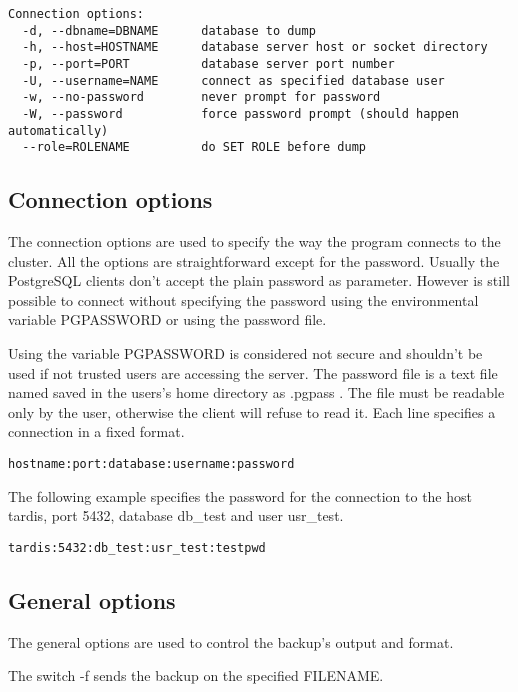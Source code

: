 \begin{verbatim}
Connection options:
  -d, --dbname=DBNAME      database to dump
  -h, --host=HOSTNAME      database server host or socket directory
  -p, --port=PORT          database server port number
  -U, --username=NAME      connect as specified database user
  -w, --no-password        never prompt for password
  -W, --password           force password prompt (should happen automatically)
  --role=ROLENAME          do SET ROLE before dump

\end{verbatim}

\subsection{Connection options}
The connection options are used to specify the way the program connects to the cluster. All the options are
straightforward except for the password. Usually the PostgreSQL clients don't accept the plain password as
parameter. However is still possible to connect without specifying the password using the
environmental variable PGPASSWORD or using the password file.\newline

Using the variable PGPASSWORD is considered not secure and shouldn't be used if  not trusted users are
accessing the server. The password file is a text file named saved in the users's home directory as
.pgpass . The file must be readable only by the user, otherwise the client will refuse to read it.\newline
Each line specifies a connection in a fixed format.
\begin{verbatim}
hostname:port:database:username:password
\end{verbatim}

The following example specifies the password for the connection to the host tardis, port 5432, database
db\_test and user usr\_test.

\begin{verbatim}
tardis:5432:db_test:usr_test:testpwd
\end{verbatim}

\subsection{General options}
The general options are used to control the backup's output and format.

The switch -f sends the backup on the specified FILENAME.\newline

